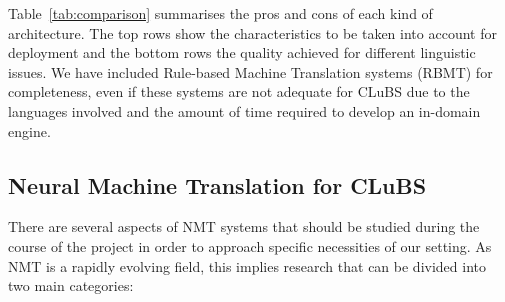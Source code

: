 \documentclass[a4paper,11pt]{article}
\begin{document}
Table~\ref{tab:comparison} summarises the pros and cons of each kind of architecture. The top rows show  the characteristics to be taken into account for deployment and the bottom rows the quality achieved for different linguistic issues. We have included Rule-based Machine Translation systems (RBMT) for completeness, even if these systems are not adequate for CLuBS due to the languages involved and the amount of time required to develop an in-domain engine.

% 



\subsection{Neural Machine Translation for CLuBS}
\label{ss:system}

There are several aspects of NMT systems that should be studied during the course of the project in order to approach specific necessities of our setting. As NMT is a rapidly evolving field, this implies research that can be divided into two main categories: 
\end{document}
